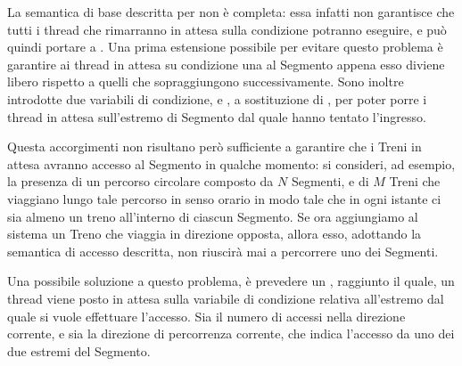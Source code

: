 \begin{description}
			La semantica di base descritta per  non è completa: essa infatti non garantisce che tutti i thread che rimarranno in attesa sulla condizione  potranno eseguire, e può quindi portare a . 			
			Una prima estensione possibile per evitare questo problema è garantire ai thread in attesa su condizione una  al Segmento appena esso diviene libero rispetto a quelli che sopraggiungono successivamente. Sono inoltre introdotte due variabili di condizione,  e , a sostituzione di , per poter porre i thread in attesa sull'estremo di Segmento dal quale hanno tentato l'ingresso.
			
			Questa accorgimenti non risultano però sufficiente a garantire che i Treni in attesa avranno accesso al Segmento in qualche momento: si consideri, ad esempio, la presenza di un percorso circolare composto da $N$ Segmenti, e di $M$ Treni che viaggiano lungo tale percorso in senso orario in modo tale che in ogni istante ci sia almeno un treno all'interno di ciascun Segmento. Se ora aggiungiamo al sistema un Treno che viaggia in direzione opposta, allora esso, adottando la semantica di accesso descritta, non riuscirà mai a percorrere uno dei Segmenti.			
			
			Una possibile soluzione a questo problema, è prevedere un , raggiunto il quale, un thread viene posto in attesa sulla variabile di condizione relativa all'estremo dal quale si vuole effettuare l'accesso. 
		Sia  il numero di accessi nella direzione corrente, e sia  la direzione di percorrenza corrente, che indica l'accesso da uno dei due estremi del Segmento.
		

\end{description}
